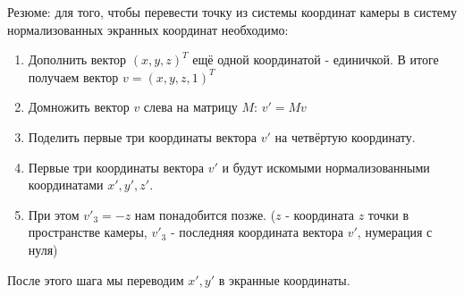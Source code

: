 \documentclass{article}
\begin{document}
Резюме: для того, чтобы перевести точку из системы координат камеры в систему нормализованных экранных координат необходимо:
\begin{enumerate}
	\item Дополнить вектор $(x, y, z)^T$ ещё одной координатой - единичкой. В итоге получаем вектор $v=(x, y, z, 1)^T$
	\item Домножить вектор $v$ слева на матрицу $M$: $v'=Mv$ 
	\item Поделить первые три координаты вектора $v'$ на четвёртую координату.
	\item Первые три координаты вектора $v'$ и будут искомыми нормализованными координатами $x', y', z'$.
	\item При этом $v'_3=-z$ нам понадобится позже. ($z$ - координата $z$ точки в пространстве камеры, $v'_3$ - последняя координата вектора $v'$, нумерация с нуля)
\end{enumerate}
После этого шага мы переводим $x', y'$ в экранные координаты.
\end{document}

